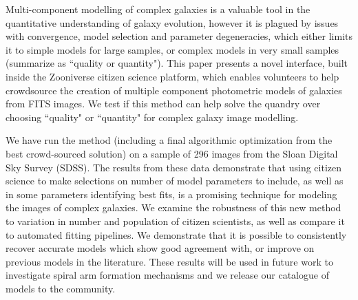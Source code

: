 \documentclass[../main.tex]{subfiles}
\begin{document}
Multi-component modelling of complex galaxies is a valuable tool in the quantitative understanding of galaxy evolution, however it is plagued by issues with convergence, model selection and parameter degeneracies, which either limits it to simple models for large samples, or complex models in very small samples (summarize as ``quality or quantity"). This paper presents a novel interface, built inside the Zooniverse citizen science platform, which enables volunteers to help crowdsource the creation of multiple component photometric models of galaxies from FITS images. We test if this method can help solve the quandry over choosing ``quality" or ``quantity" for complex galaxy image modelling.

We have run the method (including a final algorithmic optimization from the best crowd-sourced solution) on a sample of 296 images from the Sloan Digital Sky Survey (SDSS). The results from these data demonstrate that using citizen science to make selections on number of model parameters to include, as well as in some parameters identifying best fits, is a promising technique for modeling the images of complex galaxies. We examine the robustness of this new method to variation in number and population of citizen scientists, as well as compare it to automated fitting pipelines. We demonstrate that it is possible to consistently recover accurate models which show good agreement with, or improve on previous models in the literature. These results will be used in future work to investigate spiral arm formation mechanisms and we release our catalogue of models to the community.
\end{document}
